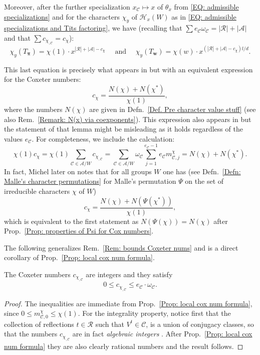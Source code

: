 Moreover, after the further specialization $x_{\mathcal{C}}\mapsto x$ of $\theta_x$ from \eqref{EQ: admissible specializations} and for the characters $\chi_y$ of $\mathcal{H}_x(W)$ as in \eqref{EQ: admissible specializations and Tits factoring}, we have (recalling that $\sum e_{\mathcal{C}}\omega_{\mathcal{C}}=|\mathcal{R}|+|\mathcal{A}|$ and that $\sum c_{\chi_{,\mathcal{C}}}=c_{\chi}$):
\begin{equation}
\chi_y(T_{\bm \pi})=\chi(1)\cdot x^{|\mathcal{R}|+|\mathcal{A}|-c_{\chi}}\quad\text{ and }\quad\chi_y(T_{\bm w})=\chi(w)\cdot x^{(|\mathcal{R}|+|\mathcal{A}|-c_{\chi})l/d}.\label{EQ: character values via Coxeter-not local}\end{equation}


\begin{rema}\label{Remark: cox numbers and N(x)+N(x*)}
This last equation is precisely what appears in \cite[Prop.~4.18]{broue-michel-french-paper} but with an equivalent expression for the Coxeter numbers: $$c_{\chi}=\dfrac{N(\chi)+N(\chi^*)}{\chi(1)},$$ where the numbers $N(\chi)$ are given in Defn.~\ref{Def. Pre character value stuff} (see also Rem.~\ref{Remark: N(x) via coexponents}). This expression also appears in \cite[Lemma~1]{michel-deligne-lusztig-derivation} but the statement of that lemma might be misleading as it holds regardless of the values $e_{\mathcal{C}}$. For completeness, we include the calculation: $$\chi(1)c_{\chi}=\chi(1)\sum_{\mathcal{C}\in\mathcal{A}/W}c_{\chi_{,\mathcal{C}}}=\sum_{\mathcal{C}\in\mathcal{A}/W}\omega_{\mathcal{C}}\sum_{j=1}^{e_{\mathcal{C}}-1}e_{\mathcal{C}}m^{\chi}_{\mathcal{C},j}=N(\chi)+N(\chi^*).$$
In fact, Michel later on \cite[Rem.~2]{michel-deligne-lusztig-derivation} notes that for all groups $W$ one has (see Defn.~\ref{Defn: Malle's character permutations} for Malle's permutation $\Psi$ on the set of irreducible characters $\chi$ of $W$) $$c_{\chi}=\dfrac{N(\chi)+N(\Psi(\chi^*))}{\chi(1)},$$ which is equivalent to the first statement as $N(\Psi(\chi))=N(\chi)$ after Prop.~\ref{Prop: properties of Psi for Cox numbers}.
\end{rema}

The following generalizes Rem.~\ref{Rem: bounds Coxeter nums} and is a direct corollary of Prop.~\ref{Prop: local cox num formula}.

\begin{coro}\label{Corol: local cox num are integers andbounds}
The Coxeter numbers $c_{\chi_{,\mathcal{C}}}$ are integers and they satisfy $$ 0\leq c_{\chi_{,\mathcal{C}}}\leq e_{\mathcal{C}}\cdot\omega_{\mathcal{C}}.$$
\end{coro}
\begin{proof}
The inequalities are immediate from Prop.~\ref{Prop: local cox num formula}, since $0\leq m^{\chi}_{\mathcal{C},0}\leq \chi(1)$. For the integrality property, notice first that the collection of reflections $t\in \mathcal{R}$ such that $V^t\in\mathcal{C}$, is a union of conjugacy classes, so that the numbers $c_{\chi_{,\mathcal{C}}}$ are in fact \emph{algebraic integers} \cite[Corol.~1, p.~52]{Serre}. After Prop.~\ref{Prop: local cox num formula} they are also clearly rational numbers and the result follows.
\end{proof}

